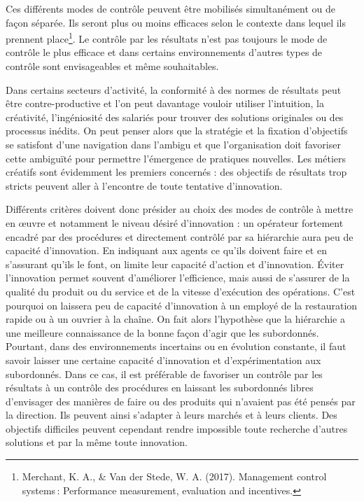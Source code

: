 \documentclass[oneside]{kaobook}
\begin{document}
Ces différents modes de contrôle peuvent être mobilisés simultanément ou de façon séparée. Ils seront plus ou moins efficaces selon le contexte dans lequel ils prennent place\footnote{Merchant, K. A., \& Van der Stede, W. A. (2017). Management control systems : Performance measurement, evaluation and incentives.}. Le contrôle par les résultats n'est pas toujours le mode de contrôle le plus efficace et dans certains environnements d'autres types de contrôle sont envisageables et même souhaitables. 

\begin{kaobox}
Dans certains secteurs d’activité, la conformité à des normes de résultats peut être contre-productive et l’on peut davantage vouloir utiliser l’intuition, la créativité, l’ingéniosité des salariés pour trouver des solutions originales ou des processus inédits. On peut penser alors que la stratégie et la fixation d’objectifs se satisfont d’une navigation dans l’ambigu et que l’organisation doit favoriser cette ambiguïté pour permettre l’émergence de pratiques nouvelles. Les métiers créatifs sont évidemment les premiers concernés : des objectifs de résultats trop stricts peuvent aller à l’encontre de toute tentative d’innovation.

Différents critères doivent donc présider au choix des modes de contrôle à mettre en œuvre et notamment le niveau désiré d’innovation : un opérateur fortement encadré par des procédures et directement contrôlé par sa hiérarchie aura peu de capacité d’innovation. En indiquant aux agents ce qu’ils doivent faire et en s’assurant qu’ils le font, on limite leur capacité d’action et d’innovation. Éviter l’innovation permet souvent d’améliorer l’efficience, mais aussi de s’assurer de la qualité du produit ou du service et de la vitesse d’exécution des opérations. C’est pourquoi on laissera peu de capacité d’innovation à un employé de la restauration rapide ou à un ouvrier à la chaîne. On fait alors l’hypothèse que la hiérarchie a une meilleure connaissance de la bonne façon d’agir que les subordonnés. Pourtant, dans des environnements incertains ou en évolution constante, il faut savoir laisser une certaine capacité d’innovation et d’expérimentation aux subordonnés. Dans ce cas, il est préférable de favoriser un contrôle par les résultats à un contrôle des procédures en laissant les subordonnés libres d’envisager des manières de faire ou des produits qui n’avaient pas été pensés par la direction. Ils peuvent ainsi s’adapter à leurs marchés et à leurs clients. Des objectifs difficiles peuvent cependant rendre impossible toute recherche d’autres solutions et par la même toute innovation.
\end{kaobox}
\end{document}
